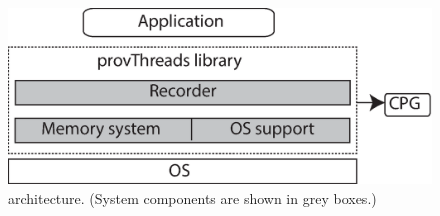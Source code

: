 
\begin{figure}[t]

\centering
      \includegraphics[scale=.4]{figure/System-basic-architecture}
  \caption{\projecttitle architecture. (System components are shown in grey boxes.)}

  \label{fig:basicSystem}

\end{figure}

